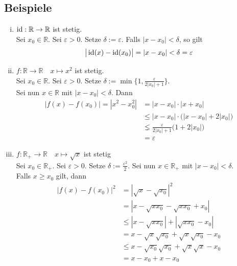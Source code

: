 \subsection{Beispiele} %
\label{sub:beispiel}
\begin{enumerate}[(i)]
	\item $\operatorname{id} : \mathbb{R} \to \mathbb{R}$ ist stetig. 
	\vspace{10pt} \\
	Sei $x_0 \in \mathds{R}$. Sei $\varepsilon >0$. Setze $\delta := \varepsilon$.
	Falls $|x-x_0|< \delta$, so gilt
	\[
		\big|\operatorname{id} (x) -\operatorname{id} (x_0) \big| = |x - x_0| < \delta = \varepsilon
	\]
	\item  $f : \mathds{R} \to \mathds{R} \quad x \mapsto x^2$ ist stetig.
	\vspace{10pt} \\
	Sei $x_0 \in \mathds{R}$. Sei $\varepsilon >0$. Setze $\delta 
	:= \min \{ 1, \frac{\varepsilon}{2 |x_0| +1} \}$. \\
	Sei nun $x \in \mathds{R}$ mit $|x - x_0|< \delta$. Dann
	\begin{align*}
		|f(x)-f(x_0)|= |x^2 - x_0^2| &= |x-x_0| \cdot |x +x_0 |
		\tag{Hinzufügen: $-x_0 +x_0$}\\
		&\le |x -x _0| \cdot \big(|x-x_0| +2 |x_0|\big) \\
		&\lneq \frac{\varepsilon}{2 |x_0| +1} \big( 1+ 2|x_0|\big) \\
		&= \varepsilon
	\end{align*}
	\item $f : \mathds{R}_+ \to \mathds{R} \quad x \mapsto \sqrt{x}$ ist stetig
	\vspace{10pt} \\
	Sei $x_0 \in \mathds{R}_+$. Sei $\varepsilon >0$. Setze $ \delta := \frac{\varepsilon^2}{2} $. Sei nun $x \in \mathds{R}_+$ mit $|x-x_0|<\delta$. \\
	Falls $x\ge x_0$ gilt, dann 
	\begin{align*}
		|f(x)-f(x_0)|^2 &= |\sqrt{x} - \sqrt{x_0}|^2 \tag{2. binomische Formel}\\
		&= \left| x - \sqrt{xx_0} - \sqrt{xx_0}+x_0 \right| \tag{Dreiecksungleichug}\\
		&\le |x-\sqrt{xx_0}| + |\sqrt{xx_0} - x_0| \tag{da $x\ge x_0$} \\
		&= x- \sqrt{x} \sqrt{x_0} + \sqrt{x} \sqrt{x_0} -x_0  \\
		&\le x -\sqrt{x_0} \sqrt{x_0} + \sqrt{x} \sqrt{x} -x_0 \\
		&= x -x_0 + x - x_0 \\

\end{align*}
\end{enumerate}
